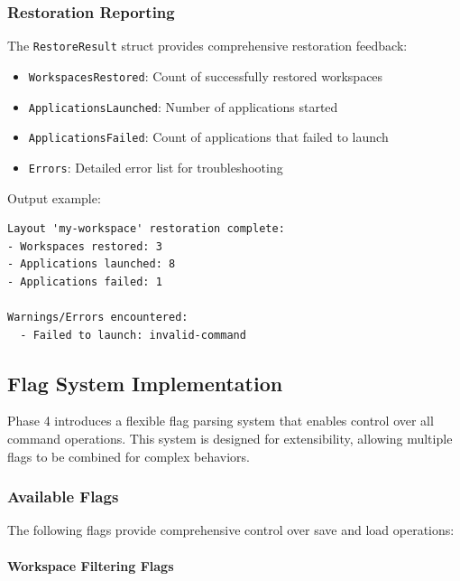 \subsubsection{Restoration Reporting}

The \texttt{RestoreResult} struct provides comprehensive restoration feedback:

\begin{itemize}
    \item \texttt{WorkspacesRestored}: Count of successfully restored workspaces
    \item \texttt{ApplicationsLaunched}: Number of applications started
    \item \texttt{ApplicationsFailed}: Count of applications that failed to launch
    \item \texttt{Errors}: Detailed error list for troubleshooting
\end{itemize}

Output example:
\begin{verbatim}
Layout 'my-workspace' restoration complete:
- Workspaces restored: 3
- Applications launched: 8
- Applications failed: 1

Warnings/Errors encountered:
  - Failed to launch: invalid-command
\end{verbatim}

\subsection{Flag System Implementation}

Phase 4 introduces a flexible flag parsing system that enables control over all command operations. This system is designed for extensibility, allowing multiple flags to be combined for complex behaviors.

\subsubsection{Available Flags}

The following flags provide comprehensive control over save and load operations:

\paragraph{Workspace Filtering Flags}

